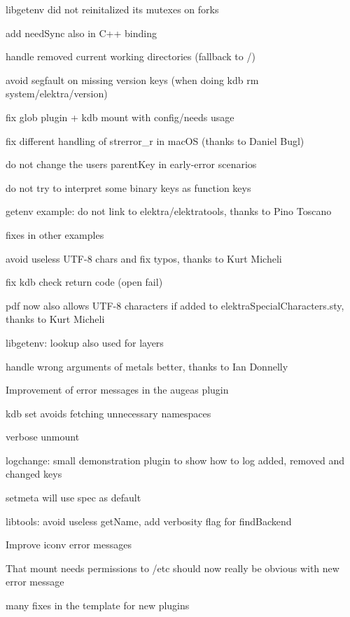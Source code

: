 \begin{DoxyItemize}
\item libgetenv did not reinitalized its mutexes on forks
\item add need\+Sync also in C++ binding
\item handle removed current working directories (fallback to /)
\item avoid segfault on missing version keys (when doing {\ttfamily kdb rm system/elektra/version})
\item fix glob plugin + kdb mount with config/needs usage
\item fix different handling of strerror\+\_\+r in mac\+OS (thanks to Daniel Bugl)
\item do not change the users parent\+Key in early-\/error scenarios
\item do not try to interpret some binary keys as function keys
\end{DoxyItemize}


\begin{DoxyItemize}
\item getenv example\+: do not link to elektra/elektratools, thanks to Pino Toscano
\item fixes in other examples
\item avoid useless U\+T\+F-\/8 chars and fix typos, thanks to Kurt Micheli
\item fix kdb check return code (open fail)
\item pdf now also allows U\+T\+F-\/8 characters if added to elektra\+Special\+Characters.\+sty, thanks to Kurt Micheli
\item libgetenv\+: lookup also used for layers
\item handle wrong arguments of metals better, thanks to Ian Donnelly
\item Improvement of error messages in the augeas plugin
\item {\ttfamily kdb set} avoids fetching unnecessary namespaces
\item verbose unmount
\item logchange\+: small demonstration plugin to show how to log added, removed and changed keys
\item setmeta will use spec as default
\item libtools\+: avoid useless get\+Name, add verbosity flag for find\+Backend
\item Improve iconv error messages
\item That mount needs permissions to /etc should now really be obvious with new error message
\item many fixes in the template for new plugins
\end{DoxyItemize}

